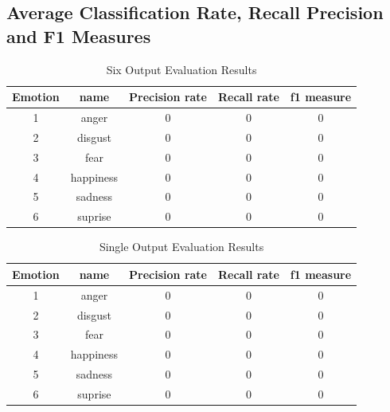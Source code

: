 \documentclass[11pt]{article}
\begin{document}
\subsection{Average Classification Rate, Recall Precision and F1 Measures}

\begin{table}[H]
\caption{Six Output Evaluation Results} %
\centering %
\begin{tabular}{c c c c c} %
\hline\hline %
Emotion & name & Precision rate & Recall rate & f1 measure\\ [0.5ex] %
\hline %
1 & anger     & 0 & 0 & 0\\ %
2 & disgust   & 0 & 0 & 0\\
3 & fear      & 0 & 0 & 0\\
4 & happiness & 0 & 0 & 0\\
5 & sadness   & 0 & 0 & 0\\ 
6 & suprise   & 0 & 0 & 0\\ [1ex] %
\hline %
\end{tabular}
\label{table:sixevaluation} %
\end{table}

\begin{table}[H]
\caption{Single Output Evaluation Results} %
\centering %
\begin{tabular}{c c c c c} %
\hline\hline %
Emotion & name & Precision rate & Recall rate & f1 measure\\ [0.5ex] %
\hline %
1 & anger     & 0 & 0 & 0\\ %
2 & disgust   & 0 & 0 & 0\\
3 & fear      & 0 & 0 & 0\\
4 & happiness & 0 & 0 & 0\\
5 & sadness   & 0 & 0 & 0\\ 
6 & suprise   & 0 & 0 & 0\\ [1ex] %
\hline %
\end{tabular}
\label{table:singleevaluation} %
\end{table}
\end{document}
